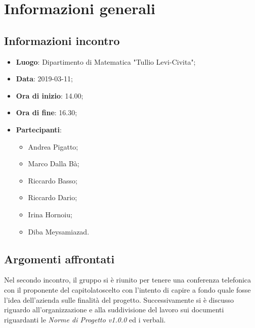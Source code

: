 \section{Informazioni generali}

\subsection{Informazioni incontro}
\begin{itemize}
	\item \textbf{Luogo}: Dipartimento di Matematica "Tullio Levi-Civita";
	\item \textbf{Data}: 2019-03-11;
	\item \textbf{Ora di inizio}: 14.00;
	\item \textbf{Ora di fine}: 16.30;
	\item \textbf{Partecipanti}: 
	\begin{itemize}
		\item Andrea Pigatto;
		\item Marco Dalla Bà;
		\item Riccardo Basso;
		\item Riccardo Dario;
		\item Irina Hornoiu;
		\item Diba Meysamiazad.
	\end{itemize}
\end{itemize}

\subsection{Argomenti affrontati}
Nel secondo incontro, il gruppo si è riunito per tenere una conferenza telefonica con il proponente del capitolato\glosp scelto
con l'intento di capire a fondo quale fosse l'idea dell'azienda sulle finalità del progetto. 
Successivamente si è discusso riguardo all'organizzazione e alla suddivisione del lavoro sui documenti riguardanti le \textit{Norme di Progetto v1.0.0} ed i verbali.
